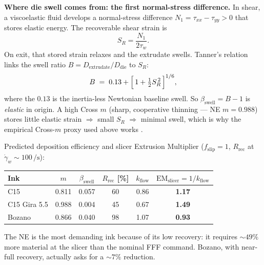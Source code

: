 \documentclass[11pt,a4paper]{article}
\newcommand{\gd}{\dot{\gamma}}
\begin{document}
\begin{goingdeeperbox}
\textbf{Where die swell comes from: the first normal-stress difference.}
In shear, a viscoelastic fluid develops a normal-stress difference
$N_1=\tau_{xx}-\tau_{yy}>0$ that stores elastic energy. The recoverable
shear strain is
\begin{equation}
S_R=\frac{N_1}{2\tau_w}.
\label{eq:recoverable}
\end{equation}
On exit, that stored strain relaxes and the extrudate swells. Tanner's
relation links the swell ratio $B=D_\mathrm{extrudate}/D_\mathrm{die}$ to
$S_R$:
\begin{equation}
B \;=\; 0.13+\Bigl[\,1+\tfrac{1}{2}S_R^{\,2}\,\Bigr]^{1/6},
\label{eq:tanner}
\end{equation}
where the $0.13$ is the inertia-less Newtonian baseline swell. So
$\beta_\mathrm{swell}=B-1$ is \emph{elastic} in origin. A high Cross $m$
(sharp, cooperative thinning --- NE $m=0.988$) stores little elastic
strain $\Rightarrow$ small $S_R$ $\Rightarrow$ minimal swell, which is why
the empirical Cross-$m$ proxy used above works \citep{Tanner1970}.
\end{goingdeeperbox}

\begin{examplebox}
Predicted deposition efficiency and slicer Extrusion Multiplier
($f_\mathrm{slip}=1$, $R_\mathrm{rec}$ at $\gd_w\sim 100\,\si{\per\s}$):

\medskip\centering
\begin{tabular}{lccccc}
\toprule
Ink & $m$ & $\beta_\mathrm{swell}$ & $R_\mathrm{rec}$ [\%]
  & $k_\mathrm{flow}$ & $\mathrm{EM}_\mathrm{slicer}=1/k_\mathrm{flow}$ \\
\midrule
C15           & 0.811 & 0.057 & 60 & 0.86 & \textbf{1.17} \\
C15 Gira 5.5  & 0.988 & 0.004 & 45 & 0.67 & \textbf{1.49} \\
Bozano        & 0.866 & 0.040 & 98 & 1.07 & \textbf{0.93} \\
\bottomrule
\end{tabular}

\medskip\flushleft
The NE is the most demanding ink because of its low recovery: it
requires $\sim 49\%$ more material at the slicer than the nominal
FFF command. Bozano, with near-full recovery, actually asks for a
$\sim 7\%$ reduction.
\end{examplebox}
\end{document}
